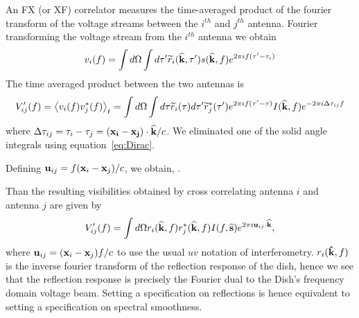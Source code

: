 \documentclass[onecolumn]{emulateapj}
\begin{document}
 An FX (or XF) correlator measures the time-averaged product of the fourier transform of the voltage streams between the $i^{th}$ and $j^{th}$ antenna. Fourier transforming the voltage stream from the $i^{th}$ antenna we obtain
\begin{equation}
v_i(f) = \int d \Omega \int d \tau' \widetilde{r}_i({\bf \widehat{k}},\tau') s({\bf \widehat{k}},f)e^{2 \pi i f(\tau'-\tau_i)}
\end{equation}
The time averaged product between the two antennas is
\begin{equation}
V_{ij}'(f) = \left \langle v_i(f) v_j^*(f) \right \rangle_t = \int d \Omega \int d \tau \widetilde{r}_i(\tau) d \tau' \widetilde{r}^*_j(\tau')e^{2 \pi i f (\tau'-\tau) } I({\bf \widehat{k}}, f) e^{- 2 \pi i \Delta \tau_{ij}f} 
\end{equation}
where $\Delta \tau_{ij} = \tau_i-\tau_j = ({\bf x_i - x_j}) \cdot {\bf \widehat{k}}/c$. We eliminated one of the solid angle integrals using equation~\ref{eq:Dirac}. 

Defining ${\bf u}_{ij} = f ({\bf x}_i-{\bf x}_j)/c$, we obtain,
.

 
 

Than the resulting visibilities obtained by cross correlating antenna $i$ and antenna $j$ are given by 
\begin{equation}
V'_{ij}(f) =  \int d \Omega r_i({\bf \widehat{k}},f) r^*_j({\bf \widehat{k}},f)  I(f,{\bf \widehat{s}})e^{2 \pi i {\bf u}_{ij} \cdot {\bf \widehat{k}}},
\end{equation}
where ${\bf u}_{ij} = ({\bf x}_i - {\bf x}_j ) f/c$ to use the usual $uv$ notation of interferometry. $r_i({\bf \hat{k}},f)$ is the inverse fourier transform of the reflection response of the dish, hence we see that the reflection response is precisely the Fourier dual to the Dish's frequency domain voltage beam. Setting a specification on reflections is hence equivalent to setting a specification on spectral smoothness. 
\end{document}
